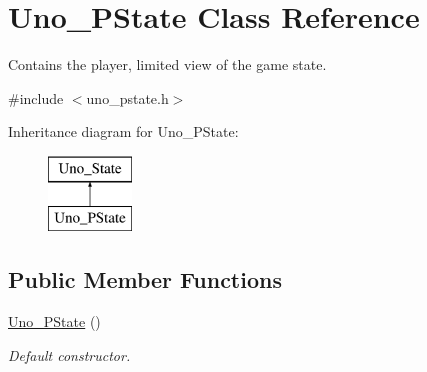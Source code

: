 \hypertarget{class_uno___p_state}{
\section{\-Uno\-\_\-\-P\-State \-Class \-Reference}
\label{class_uno___p_state}
}


\-Contains the player, limited view of the game state.  




{\ttfamily \#include $<$uno\-\_\-pstate.\-h$>$}

\-Inheritance diagram for \-Uno\-\_\-\-P\-State\-:\begin{figure}[H]
\begin{center}
\leavevmode
\includegraphics[height=2.000000cm]{class_uno___p_state}
\end{center}
\end{figure}
\subsection*{\-Public \-Member \-Functions}
\begin{DoxyCompactItemize}
\item 
\hyperlink{class_uno___p_state_aafaaf283df233adbb7d3cac2eaf9199d}{\-Uno\-\_\-\-P\-State} ()
\begin{DoxyCompactList}\small\item\em \-Default constructor. \end{DoxyCompactList}\end{DoxyCompactItemize}

